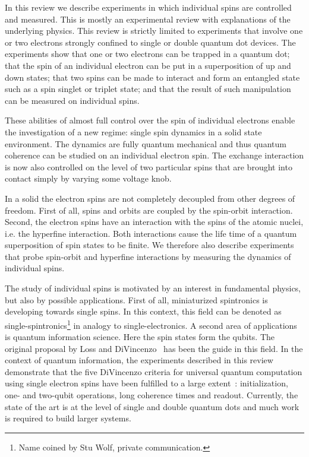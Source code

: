 \documentclass[12pt,aps,nofootinbib]{revtex4-1}
\begin{document}
In this review we describe experiments in which individual spins
are controlled and measured. This is mostly an experimental review
with explanations of the underlying physics. This review is
strictly limited to experiments that involve one or two electrons
strongly confined to single or double quantum dot devices. The
experiments show that one or two electrons can be trapped in a
quantum dot; that the spin of an individual electron can be put in
a superposition of up and down states; that two spins can be made
to interact and form an entangled state such as a spin singlet or triplet state; and that the result of such manipulation can be measured on individual spins.

These abilities of almost full control over the spin of individual
electrons enable the investigation of a new regime: single spin
dynamics in a solid state environment. The dynamics are fully
quantum mechanical and thus quantum coherence can be studied on an
individual electron spin. The exchange interaction is now also
controlled on the level of two particular spins that are brought
into contact simply by varying some voltage knob.

In a solid the electron spins are not completely decoupled from
other degrees of freedom. First of all, spins and orbits are
coupled by the spin-orbit interaction. Second, the electron spins
have an interaction with the spins of the atomic nuclei, i.e. the
hyperfine interaction. Both interactions cause the life time of a
quantum superposition of spin states to be finite. We therefore
also describe experiments that probe spin-orbit and hyperfine
interactions by measuring the dynamics of individual spins.

The study of individual spins is motivated by an interest in
fundamental physics, but also by possible applications. First of
all, miniaturized spintronics is developing towards single spins.
In this context, this field can be denoted as
single-spintronics\footnote{Name coined by Stu Wolf, private communication.} in analogy to single-electronics.
A second area of applications is quantum information science. Here
the spin states form the qubits. The
original proposal by Loss and DiVincenzo~\cite{LossDiVincenzo} has
been the guide in this field. In the context of quantum
information, the experiments described in this review demonstrate
that the five DiVincenzo criteria for universal quantum
computation using single electron spins have been fulfilled to a large extent~\cite{DiVincenzo_criteria}:
initialization, one- and two-qubit operations, long coherence times
and readout. Currently, the state of the art is at the level of
single and double quantum dots and much work is required to build
larger systems.
\end{document}
